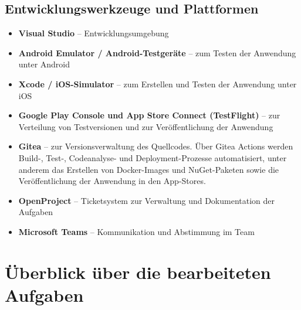 \subsection{Entwicklungswerkzeuge und Plattformen}
\begin{itemize}
    \item \textbf{Visual Studio} – Entwicklungsumgebung
    \item \textbf{Android Emulator / Android-Testgeräte} – zum Testen der Anwendung unter Android
    \item \textbf{Xcode / iOS-Simulator} – zum Erstellen und Testen der Anwendung unter iOS
    \item \textbf{Google Play Console und App Store Connect (TestFlight)} – zur Verteilung von Testversionen
            und zur Veröffentlichung der Anwendung
    \item \textbf{Gitea} – zur Versionsverwaltung des Quellcodes. Über Gitea Actions werden Build-, Test-,
            Codeanalyse- und Deployment-Prozesse automatisiert, unter anderem das Erstellen von Docker-Images
            und NuGet-Paketen sowie die Veröffentlichung der Anwendung in den App-Stores.
    \item \textbf{OpenProject} – Ticketsystem zur Verwaltung und Dokumentation der Aufgaben
    \item \textbf{Microsoft Teams} – Kommunikation und Abstimmung im Team
\end{itemize}

\section{Überblick über die bearbeiteten Aufgaben}